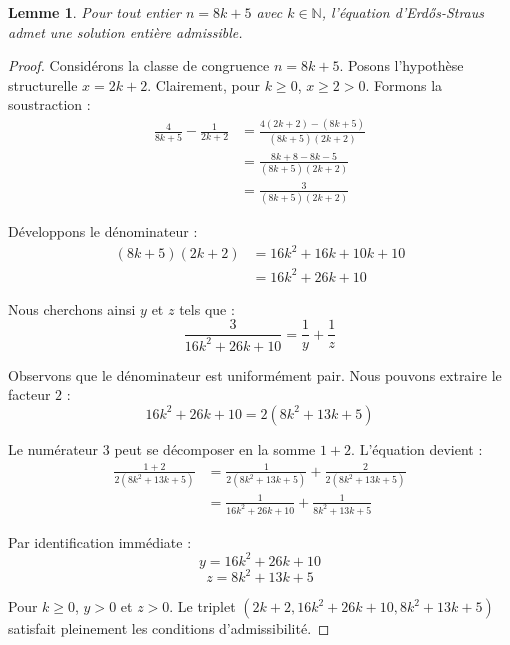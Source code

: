 \documentclass[11pt,a4paper]{article}
\newtheorem{lemma}{Lemme}
\begin{document}
\begin{lemma}
Pour tout entier $n = 8k + 5$ avec $k \in \mathbb{N}$, l'équation d'Erd\H{{o}}s-Straus admet une solution entière admissible.
\end{lemma}

\begin{proof}
Considérons la classe de congruence $n = 8k + 5$. Posons l'hypothèse structurelle $x = 2k + 2$. Clairement, pour $k \ge 0$, $x \ge 2 > 0$.
Formons la soustraction :
\begin{align*}
\frac{4}{8k+5} - \frac{1}{2k+2} &= \frac{4(2k+2) - (8k+5)}{(8k+5)(2k+2)} \\
&= \frac{8k + 8 - 8k - 5}{(8k+5)(2k+2)} \\
&= \frac{3}{(8k+5)(2k+2)}
\end{align*}

Développons le dénominateur :
\begin{align*}
(8k+5)(2k+2) &= 16k^2 + 16k + 10k + 10 \\
&= 16k^2 + 26k + 10
\end{align*}

Nous cherchons ainsi $y$ et $z$ tels que :
\begin{equation}
\frac{3}{16k^2 + 26k + 10} = \frac{1}{y} + \frac{1}{z}
\end{equation}

Observons que le dénominateur est uniformément pair. Nous pouvons extraire le facteur $2$ :
\begin{equation}
16k^2 + 26k + 10 = 2(8k^2 + 13k + 5)
\end{equation}

Le numérateur $3$ peut se décomposer en la somme $1 + 2$. L'équation devient :
\begin{align*}
\frac{1 + 2}{2(8k^2 + 13k + 5)} &= \frac{1}{2(8k^2 + 13k + 5)} + \frac{2}{2(8k^2 + 13k + 5)} \\
&= \frac{1}{16k^2 + 26k + 10} + \frac{1}{8k^2 + 13k + 5}
\end{align*}

Par identification immédiate :
\begin{equation}
y = 16k^2 + 26k + 10
\end{equation}
\begin{equation}
z = 8k^2 + 13k + 5
\end{equation}

Pour $k \ge 0$, $y > 0$ et $z > 0$. Le triplet $(2k+2, 16k^2+26k+10, 8k^2+13k+5)$ satisfait pleinement les conditions d'admissibilité.
\end{proof}
\end{document}

